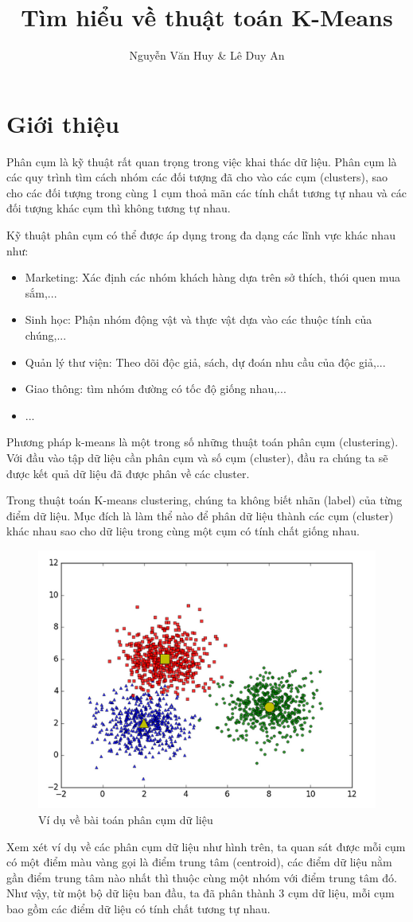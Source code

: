 \documentclass{article}
\title{Tìm hiểu về thuật toán K-Means}
\author{Nguyễn Văn Huy \& Lê Duy An}
\begin{document}
	\maketitle{} 
	\newpage
	\tableofcontents
	\newpage
	\section{Giới thiệu}
	Phân cụm là kỹ thuật rất quan trọng trong việc khai thác dữ liệu. Phân cụm là các quy trình tìm cách nhóm các đối tượng đã cho vào các cụm (clusters), sao cho các đối tượng trong cùng 1 cụm thoả mãn các tính chất tương tự nhau và các đối tượng khác cụm thì không tương tự nhau.\par
	\smallskip
	Kỹ thuật phân cụm có thể được áp dụng trong đa dạng các lĩnh vực khác nhau như:
	\begin{itemize}
		\item Marketing: Xác định các nhóm khách hàng dựa trên sở thích, thói quen mua sắm,...
		\item Sinh học: Phận nhóm động vật và thực vật dựa vào các thuộc tính của chúng,...
		\item Quản lý thư viện: Theo dõi độc giả, sách, dự đoán nhu cầu của độc giả,...
		\item Giao thông: tìm nhóm đường có tốc độ giống nhau,...
		\item ...
	\end{itemize}
	Phương pháp k-means là một trong số những thuật toán phân cụm (clustering). Với đầu vào tập dữ liệu cần phân cụm và số cụm (cluster), đầu ra chúng ta sẽ được kết quả dữ liệu đã được phân về các cluster.\par
	\smallskip
	Trong thuật toán K-means clustering, chúng ta không biết nhãn (label) của từng điểm dữ liệu. Mục đích là làm thể nào để phân dữ liệu thành các cụm (cluster) khác nhau sao cho dữ liệu trong cùng một cụm có tính chất giống nhau.\par
	\smallskip
	\begin{figure}[h]
		\centering
		\includegraphics[width=0.7\linewidth]{img/cluster_ex}
		\caption{Ví dụ về bài toán phân cụm dữ liệu}
	\end{figure}\par
	Xem xét ví dụ về các phân cụm dữ liệu như hình trên, ta quan sát được mỗi cụm có một điểm màu vàng gọi là điểm trung tâm (centroid), các điểm dữ liệu nằm gần điểm trung tâm nào nhất thì thuộc cùng một nhóm với điểm trung tâm đó. Như vậy, từ một bộ dữ liệu ban đầu, ta đã phân thành 3 cụm dữ liệu, mỗi cụm bao gồm các điểm dữ liệu có tính chất tương tự nhau.
	\newpage
\end{document}
